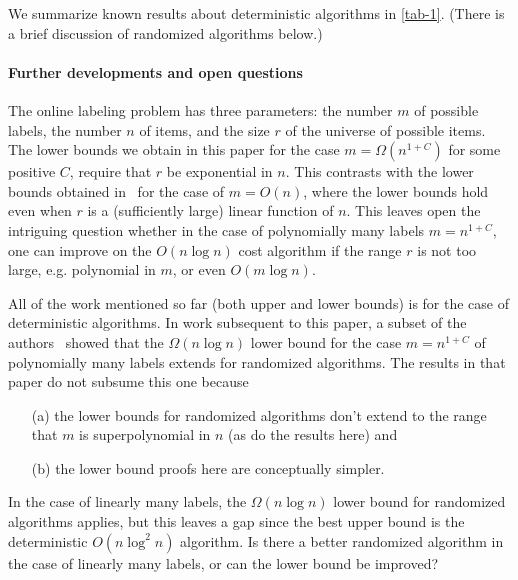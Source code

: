 \documentclass[unicode,review]{siamart1116}
\numberwithin{theorem}{section}
\begin{document}
 We summarize known results about deterministic algorithms in \cref{tab-1}. 
(There is a  brief discussion of randomized algorithms below.)

\paragraph{Further developments and open questions}
The online labeling problem has three parameters: the number  $m$ of possible labels, the number $n$ of items, and the size $r$ of the universe of possible items.   The lower bounds we obtain in this paper for the case  $m=\Omega(n^{1+C})$ for some positive $C$, require that $r$ be exponential in $n$.  This contrasts with the lower bounds obtained  in~\cite{BKS} for the case of   $m=O(n)$, where the lower bounds hold even when $r$ is a
(sufficiently large) linear function of $n$.   This leaves open the intriguing question whether in the case of polynomially many
labels $m=n^{1+C}$, one can improve on the $O(n\log n)$ cost algorithm if the range $r$ is not too large, e.g. polynomial
in $m$, or even $O(m\log n)$.

All of the work mentioned so far (both upper and lower bounds) is for the case of deterministic algorithms.  In
work subsequent to this paper, a subset of the authors~\cite{BKS2} showed that the $\Omega(n \log n)$ lower
bound for the case  $m=n^{1+C}$ of polynomially many labels extends for randomized algorithms.  
The results in that paper do not subsume this one because \begin{itemize}
    \item[(a)] the lower bounds for randomized algorithms don't extend to the range that $m$ is superpolynomial in $n$ (as do the results here) and 
    \item[(b)] the lower bound proofs here are conceptually simpler.
\end{itemize}

In the case of  linearly many labels, the $\Omega(n\log n)$ lower bound for randomized algorithms applies, but
this leaves a gap since the best upper bound is the deterministic $O(n \log^2n)$ algorithm.   Is there a better randomized
algorithm in the case of linearly many labels, or can the lower bound be improved?
\end{document}
